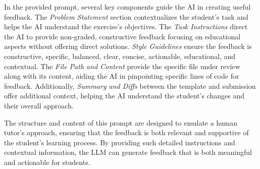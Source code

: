 \documentclass[manuscript,screen,review]{acmart}
\begin{document}
In the provided prompt, several key components guide the AI in creating useful feedback. The \textit{Problem Statement} section contextualizes the student's task and helps the AI understand the exercise's objectives.
The \textit{Task Instructions} direct the AI to provide non-graded, constructive feedback focusing on educational aspects without offering direct solutions.
\textit{Style Guidelines} ensure the feedback is constructive, specific, balanced, clear, concise, actionable, educational, and contextual.
The \textit{File Path and Content} provide the specific file under review along with its content, aiding the AI in pinpointing specific lines of code for feedback.
Additionally, \textit{Summary and Diffs} between the template and submission offer additional context, helping the AI understand the student's changes and their overall approach.

The structure and content of this prompt are designed to emulate a human tutor's approach, ensuring that the feedback is both relevant and supportive of the student's learning process.
By providing such detailed instructions and contextual information, the LLM can generate feedback that is both meaningful and actionable for students.
\end{document}

